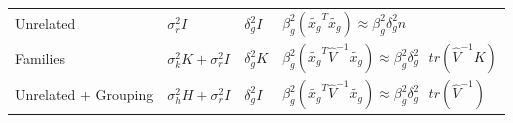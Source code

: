 \documentclass[]{book}
\begin{document}
\begin{longtable}[]{@{}llll@{}}
\begin{minipage}[t]{0.21\columnwidth}
Unrelated\strut
\end{minipage} & \begin{minipage}[t]{0.15\columnwidth}\raggedright\strut
\(\sigma_r^2 I\)\strut
\end{minipage} & \begin{minipage}[t]{0.16\columnwidth}\raggedright\strut
\(\delta_g^2 I\)\strut
\end{minipage} & \begin{minipage}[t]{0.37\columnwidth}\raggedright\strut
\(\beta^2_g (\tilde{x_g}^T \tilde{x_g}) \approx \beta^2_g \delta_g^2 n\)\strut
\end{minipage}\tabularnewline
\begin{minipage}[t]{0.21\columnwidth}\raggedright\strut
Families\strut
\end{minipage} & \begin{minipage}[t]{0.15\columnwidth}\raggedright\strut
\(\sigma_k^2 K + \sigma_r^2 I\)\strut
\end{minipage} & \begin{minipage}[t]{0.16\columnwidth}\raggedright\strut
\(\delta_g^2 K\)\strut
\end{minipage} & \begin{minipage}[t]{0.37\columnwidth}\raggedright\strut
\(\beta^2_g (\tilde{x_g}^T \hat{V}^{-1} \tilde{x_g}) \approx \beta^2_g \delta_g^2 \mbox { } tr(\hat{V}^{-1} K)\)\strut
\end{minipage}\tabularnewline
\begin{minipage}[t]{0.21\columnwidth}\raggedright\strut
Unrelated + Grouping\strut
\end{minipage} & \begin{minipage}[t]{0.15\columnwidth}\raggedright\strut
\(\sigma_h^2 H + \sigma_r^2 I\)\strut
\end{minipage} & \begin{minipage}[t]{0.16\columnwidth}\raggedright\strut
\(\delta_g^2 I\)\strut
\end{minipage} & \begin{minipage}[t]{0.37\columnwidth}\raggedright\strut
\(\beta^2_g (\tilde{x_g}^T \hat{V}^{-1} \tilde{x_g}) \approx \beta^2_g \delta_g^2 \mbox { } tr(\hat{V}^{-1})\)\strut
\end{minipage}\tabularnewline
\bottomrule
\end{longtable}
\end{document}
